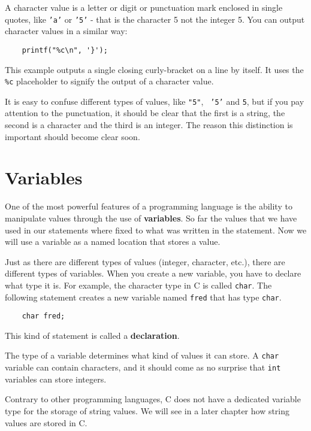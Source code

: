 A character value is a letter or digit or punctuation mark
enclosed in single quotes, like {\tt 'a'} or {\tt '5'} - that is the character 5 not the integer 5.
You can output character values in a similar way:

\begin{verbatim}
    printf("%c\n", '}');
\end{verbatim}
%
This example outputs a single closing curly-bracket on a line
by itself. It uses the {\tt \%c} placeholder to signify the output of a character
value.

It is easy to confuse different types of values, like {\tt "5"}, {\tt
'5'} and {\tt 5}, but if you pay attention to the punctuation, it
should be clear that the first is a string, the second is a character
and the third is an integer.  The reason this distinction is important
should become clear soon.

\section{Variables}

One of the most powerful features of a programming language is the
ability to manipulate values through the use of {\bf variables}.  So far
the values that we have used in our statements where fixed to what 
was written in the statement. Now we will use a variable as a named 
location that stores a value.  

Just as there are different types of values (integer, character,
etc.), there are different types of variables.  When you create a new
variable, you have to declare what type it is.  For example, the
character type in C is called {\tt char}.  The following statement
creates a new variable named {\tt fred} that has type {\tt char}.

\begin{verbatim}
    char fred;
\end{verbatim}
%
This kind of statement is called a {\bf declaration}.

The type of a variable determines what kind of values it can
store.  A {\tt char} variable can contain characters, and it should
come as no surprise that {\tt int} variables can store integers.

Contrary to other programming languages, C does not have a 
dedicated variable type for the storage of string values. We will see in
a later chapter how string values are stored in C. 

